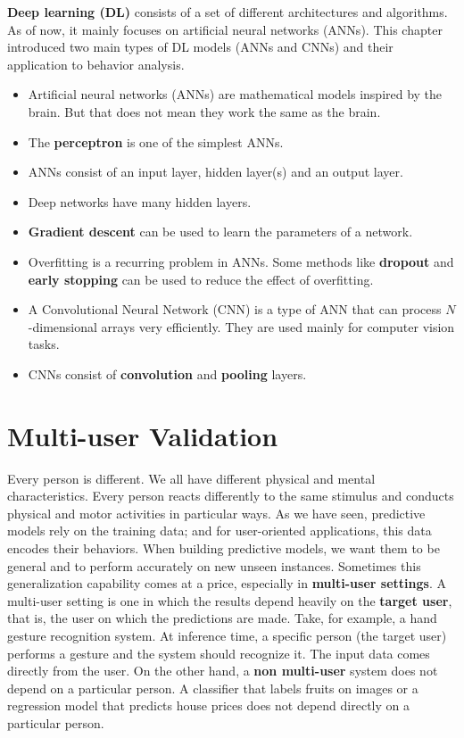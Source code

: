 \documentclass[
  11pt,
]{krantz}
\providecommand{\tightlist}{%
  \setlength{\itemsep}{0pt}\setlength{\parskip}{0pt}}
\begin{document}
\textbf{Deep learning (DL)} consists of a set of different architectures and algorithms. As of now, it mainly focuses on artificial neural networks (ANNs). This chapter introduced two main types of DL models (ANNs and CNNs) and their application to behavior analysis.

\begin{itemize}
\tightlist
\item
  Artificial neural networks (ANNs) are mathematical models inspired by the brain. But that does not mean they work the same as the brain.
\item
  The \textbf{perceptron} is one of the simplest ANNs.
\item
  ANNs consist of an input layer, hidden layer(s) and an output layer.
\item
  Deep networks have many hidden layers.
\item
  \textbf{Gradient descent} can be used to learn the parameters of a network.
\item
  Overfitting is a recurring problem in ANNs. Some methods like \textbf{dropout} and \textbf{early stopping} can be used to reduce the effect of overfitting.
\item
  A Convolutional Neural Network (CNN) is a type of ANN that can process \(N\)-dimensional arrays very efficiently. They are used mainly for computer vision tasks.
\item
  CNNs consist of \textbf{convolution} and \textbf{pooling} layers.
\end{itemize}



\hypertarget{multiuser}{%
\chapter{Multi-user Validation}\label{multiuser}}

Every person is different. We all have different physical and mental characteristics. Every person reacts differently to the same stimulus and conducts physical and motor activities in particular ways. As we have seen, predictive models rely on the training data; and for user-oriented applications, this data encodes their behaviors. When building predictive models, we want them to be general and to perform accurately on new unseen instances. Sometimes this generalization capability comes at a price, especially in \textbf{multi-user settings}. A multi-user setting is one in which the results depend heavily on the \textbf{target user}, that is, the user on which the predictions are made. Take, for example, a hand gesture recognition system. At inference time, a specific person (the target user) performs a gesture and the system should recognize it. The input data comes directly from the user. On the other hand, a \textbf{non multi-user} system does not depend on a particular person. A classifier that labels fruits on images or a regression model that predicts house prices does not depend directly on a particular person.
\end{document}
